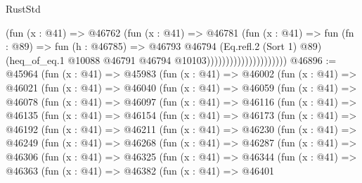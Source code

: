 \begin{lexlean}{RustStd}
\begin{coremodule}
                                      (fun (x : @41) =>
                                      @46762
                                        (fun (x : @41) =>
                                        @46781
                                          (fun (x : @41) =>
                                          fun (fn : @89) =>
                                          fun (h : @46785) =>
                                          @46793
                                            @46794
                                            (Eq.refl.{2} (Sort 1) @89)
                                            (heq_of_eq.{1}
                                              @10088
                                              @46791
                                              @46794
                                              @10103)))))))))))))))))))))
@46896 := @45964
    (fun (x : @41) =>
    @45983
      (fun (x : @41) =>
      @46002
        (fun (x : @41) =>
        @46021
          (fun (x : @41) =>
          @46040
            (fun (x : @41) =>
            @46059
              (fun (x : @41) =>
              @46078
                (fun (x : @41) =>
                @46097
                  (fun (x : @41) =>
                  @46116
                    (fun (x : @41) =>
                    @46135
                      (fun (x : @41) =>
                      @46154
                        (fun (x : @41) =>
                        @46173
                          (fun (x : @41) =>
                          @46192
                            (fun (x : @41) =>
                            @46211
                              (fun (x : @41) =>
                              @46230
                                (fun (x : @41) =>
                                @46249
                                  (fun (x : @41) =>
                                  @46268
                                    (fun (x : @41) =>
                                    @46287
                                      (fun (x : @41) =>
                                      @46306
                                        (fun (x : @41) =>
                                        @46325
                                          (fun (x : @41) =>
                                          @46344
                                            (fun (x : @41) =>
                                            @46363
                                              (fun (x : @41) =>
                                              @46382
                                                (fun (x : @41) =>
                                                @46401

\end{coremodule}
\end{lexlean}
